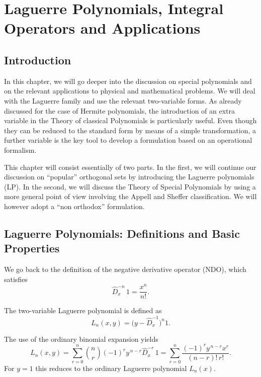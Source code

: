 
\chapter{Laguerre Polynomials, Integral Operators and Applications}

\section{Introduction}

In this chapter, we will go deeper into the discussion on special polynomials
and on the relevant applications to physical and mathematical problems.
We will deal with the Laguerre family and use the relevant two-variable forms.
As already discussed for the case of Hermite polynomials, the introduction of
an extra variable in the Theory of classical Polynomials is particularly useful.
Even though they can be reduced to the standard form by means of a simple
transformation, a further variable is the key tool to develop a formulation
based on an operational formalism.

This chapter will consist essentially of two parts. In the first, we will
continue our discussion on ``popular'' orthogonal sets by introducing the
Laguerre polynomials (LP). In the second, we will discuss the Theory of
Special Polynomials by using a more general point of view involving the
Appell and Sheffer classification. We will however adopt a ``non orthodox''
formulation.

\section{Laguerre Polynomials: Definitions and Basic Properties}

We go back to the definition of the negative derivative operator (NDO),
which satisfies
\begin{equation}
\hat D_x^{-n}\,1 = \frac{x^n}{n!}.
\label{eq:4.1.1}
\end{equation}

The two-variable Laguerre polynomial is defined as
\begin{equation}
L_n(x,y) = \bigl(y - \hat D_x^{-1}\bigr)^n 1.
\label{eq:4.1.2}
\end{equation}

The use of the ordinary binomial expansion yields
\begin{equation}
L_n(x,y) = \sum_{r=0}^{n} \binom{n}{r} (-1)^r y^{\,n-r} \hat D_x^{-r}\,1
= \sum_{r=0}^{n} \frac{(-1)^r y^{\,n-r} x^r}{(n-r)!\,r!}.
\label{eq:4.1.3}
\end{equation}
For $y=1$ this reduces to the ordinary Laguerre polynomial $L_n(x)$.

